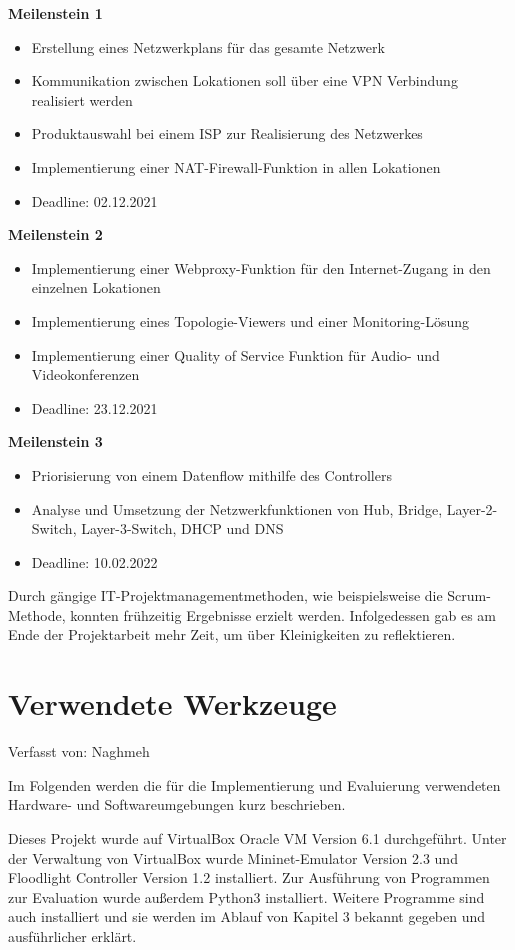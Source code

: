 \documentclass[fontsize=12pt,paper=a4,open=any,parskip=half,
  twoside=false,toc=listof,toc=bibliography,fleqn,leqno,
  captions=nooneline,captions=tableabove,british]{scrbook}
\begin{document}
\textbf{Meilenstein 1}
\begin{itemize}
 \item Erstellung eines Netzwerkplans für das gesamte Netzwerk
 \item Kommunikation zwischen Lokationen soll über eine VPN Verbindung realisiert werden
 \item Produktauswahl bei einem ISP zur Realisierung des Netzwerkes
 \item Implementierung einer NAT-Firewall-Funktion in allen Lokationen
 \item Deadline: 02.12.2021
\end{itemize}

\textbf{Meilenstein 2}
\begin{itemize}
 \item Implementierung einer Webproxy-Funktion für den Internet-Zugang in den einzelnen Lokationen
 \item Implementierung eines Topologie-Viewers und einer Monitoring-Lösung
 \item Implementierung einer Quality of Service Funktion für Audio- und Videokonferenzen
 \item Deadline: 23.12.2021
\end{itemize}

\textbf{Meilenstein 3}
\begin{itemize}
 \item Priorisierung von einem Datenflow mithilfe des Controllers
 \item Analyse und Umsetzung der Netzwerkfunktionen von Hub, Bridge, Layer-2-Switch, Layer-3-Switch, DHCP und DNS
 \item Deadline: 10.02.2022
\end{itemize}

Durch gängige IT-Projektmanagementmethoden, wie beispielsweise die Scrum-Methode, konnten frühzeitig Ergebnisse erzielt werden. Infolgedessen gab es am Ende der Projektarbeit mehr Zeit, um über Kleinigkeiten zu reflektieren.

\section{Verwendete Werkzeuge}
{\tiny Verfasst von: Naghmeh\par}
Im Folgenden werden die für die Implementierung und Evaluierung verwendeten Hardware- und Softwareumgebungen kurz beschrieben.\par
Dieses Projekt wurde auf VirtualBox Oracle VM Version 6.1 durchgeführt. Unter der Verwaltung von VirtualBox wurde Mininet-Emulator Version 2.3 und Floodlight Controller Version 1.2 installiert. Zur Ausführung von Programmen zur Evaluation wurde außerdem Python3 installiert. Weitere Programme sind auch installiert und sie werden im Ablauf von Kapitel 3 bekannt gegeben und ausführlicher erklärt.
\end{document}
